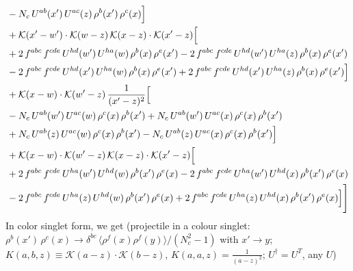 \documentclass[9pt]{article}
\numberwithin{equation}{section}
\newcommand{\new}[1]{{\color{blue}#1}}
\begin{document}
\begin{align}
& -N_{c}\,U^{ab}(x')\,U^{ac}(z)\,\rho^{b}(x')\,\rho^{c}(x)\Big]\notag\\
& +\mathcal{K}(x'-w')\cdot\mathcal{K}(w-z)\,\mathcal{K}(x-z)\cdot\mathcal{K}(x'-z)\Big[\notag\\
& +2\,f^{abc}\,f^{cde}\,U^{hd}(w')\,U^{ha}(w)\,\rho^{b}(x)\,\rho^{e}(x') -2\,f^{abc}\,f^{cde}\,U^{hd}(w')\,U^{ha}(z)\,\rho^{b}(x)\,\rho^{e}(x')\notag\\
& -2\,f^{abc}\,f^{cde}\,U^{hd}(x')\,U^{ha}(w)\,\rho^{b}(x)\,\rho^{e}(x') +2\,f^{abc}\,f^{cde}\,U^{hd}(x')\,U^{ha}(z)\,\rho^{b}(x)\,\rho^{e}(x')\Big]\notag\\
& +\mathcal{K}(x-w)\cdot\mathcal{K}(w'-z)\,\frac{1}{(x'-z)^{2}}\Big[\notag\\
& -N_{c}\,U^{ab}(w')\,U^{ac}(w)\,\rho^{c}(x)\,\rho^{b}(x') +N_{c}\,U^{ab}(w')\,U^{ac}(x)\,\rho^{c}(x)\,\rho^{b}(x')\notag\\
& +N_{c}\,U^{ab}(z)\,U^{ac}(w)\,\rho^{c}(x)\,\rho^{b}(x') -N_{c}\,U^{ab}(z)\,U^{ac}(x)\,\rho^{c}(x)\,\rho^{b}(x')\Big]\notag\\
& +\mathcal{K}(x-w)\cdot\mathcal{K}(w'-z)\,\mathcal{K}(x-z)\cdot\mathcal{K}(x'-z)\Big[\notag\\
& +2\,f^{abc}\,f^{cde}\,U^{ha}(w')\,U^{hd}(w)\,\rho^{b}(x')\,\rho^{e}(x) -2\,f^{abc}\,f^{cde}\,U^{ha}(w')\,U^{hd}(x)\,\rho^{b}(x')\,\rho^{e}(x)\notag\\
& -2\,f^{abc}\,f^{cde}\,U^{ha}(z)\,U^{hd}(w)\,\rho^{b}(x')\,\rho^{e}(x) +2\,f^{abc}\,f^{cde}\,U^{ha}(z)\,U^{hd}(x)\,\rho^{b}(x')\,\rho^{e}(x)\Big]\Bigg]
\end{align}
In color singlet form, we get \new{(projectile in a colour singlet: $\rho^b(x')\,\rho^c(x)\to\delta^{bc}\,\langle\rho^f(x)\rho^f(y)\rangle/(N_c^2-1)$ with $x'\to y$; $K(a,b,z)\equiv\mathcal K(a-z)\cdot\mathcal K(b-z)$, $K(a,a,z)=\frac{1}{(a-z)^2}$; $U^\dagger=U^T$, any $U$)}
\end{document}
